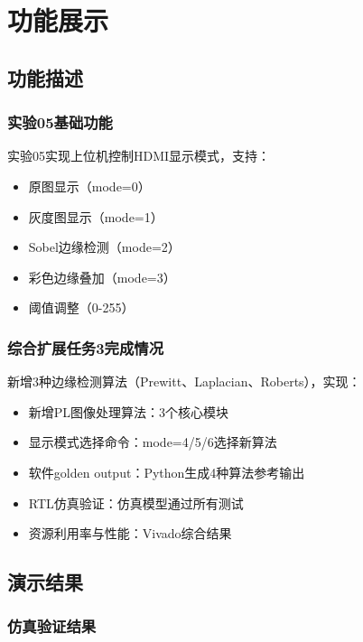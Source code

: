 
\section{功能展示}

\subsection{功能描述}

\subsubsection{实验05基础功能}

实验05实现上位机控制HDMI显示模式，支持：
\begin{itemize}
    \item 原图显示（mode=0）
    \item 灰度图显示（mode=1）
    \item Sobel边缘检测（mode=2）
    \item 彩色边缘叠加（mode=3）
    \item 阈值调整（0-255）
\end{itemize}

\subsubsection{综合扩展任务3完成情况}

新增3种边缘检测算法（Prewitt、Laplacian、Roberts），实现：
\begin{itemize}
    \item 新增PL图像处理算法：3个核心模块
    \item 显示模式选择命令：mode=4/5/6选择新算法
    \item 软件golden output：Python生成4种算法参考输出
    \item RTL仿真验证：仿真模型通过所有测试
    \item 资源利用率与性能：Vivado综合结果
\end{itemize}

\subsection{演示结果}

\subsubsection{仿真验证结果}

